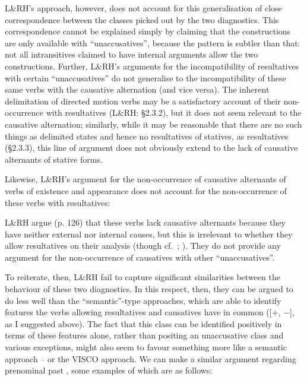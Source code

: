 \documentclass[output=paper]{langsci/langscibook}
\begin{document}
\ea
    \z
\z
L\&RH’s approach, however, does not account for this generalisation of close
correspondence between the classes picked out by the two diagnostics. This
correspondence cannot be explained simply by claiming that the constructions
are only available with \enquote{unaccusatives}, because the pattern is subtler
than that: not all intransitives claimed to have internal arguments allow the
two constructions. Further, L\&RH’s arguments for the incompatibility of
resultatives with certain \enquote{unaccusatives} do not generalise to the
incompatibility of these same verbs with the causative alternation (and vice
versa). The inherent delimitation of directed motion verbs may be a
satisfactory account of their non-occurrence with resultatives (L\&RH: §2.3.2),
but it does not seem relevant to the causative alternation; similarly, while it
may be reasonable that there are no such things as delimited states and hence
no resultatives of statives, as resultatives (§2.3.3), this line of argument
does not obviously extend to the lack of causative alternants of stative forms.

Likewise, L\&RH’s argument for the non-occurrence of causative alternants of
verbs of existence and appearance does not account for the non-occurrence of
these verbs with resultatives:

\ea
    \z
\z
L\&RH argue (p. 126) that these verbs lack causative alternants because they have
neither external nor internal causes, but this is irrelevant to whether they
allow resultatives on their analysis (though cf.\ \citealt{Ramchand2008};
\citealt{Baker2018,Baker2019}). They do not provide any argument for the
non-occurrence of causatives with other \enquote{unaccusatives}.

To reiterate, then, L\&RH fail to capture significant similarities between the
behaviour of these two diagnostics. In this respect, then, they can be argued
to do less well than the \enquote{semantic}-type approaches, which are able to
identify features the verbs allowing resultatives and causatives have in common
([$+$\Change{}, $-$\Initiation{}], as I suggested above). The fact that this class
can be identified positively in terms of these features alone, rather than
positing an unaccusative class and various exceptions, might also seem to
favour something more like a semantic approach – or the VISCO approach. We can
make a similar argument regarding prenominal past , some examples of
which are as follows:
\end{document}
